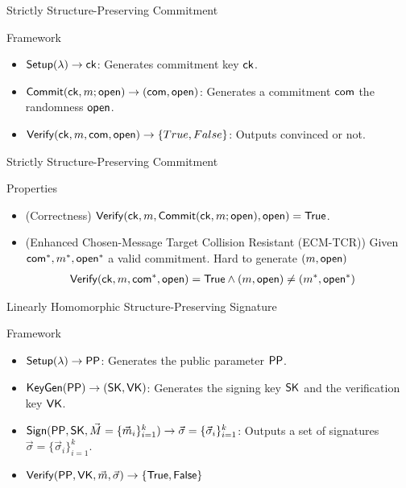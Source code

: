 \begin{frame}{Strictly Structure-Preserving Commitment~\cite{DBLP:conf/eurocrypt/AbeKOT15}}

  \begin{block}{Framework}
      \begin{itemize}
      \item ${\mathsf{Setup}}(\lambda) \to \mathsf{ck}$: Generates commitment key $\mathsf{ck}$.
      \item ${\mathsf{Commit}}(\mathsf{ck}, m; \mathsf{open}) \to (\mathsf{com},\mathsf{open})$: Generates a commitment $\mathsf{com}$ \wrt the randomness $\mathsf{open}$.
      \item ${\mathsf{Verify}}(\mathsf{ck}, m, \mathsf{com}, \mathsf{open}) \to \{True, False\}$: Outputs convinced or not.
      \end{itemize}
  \end{block}
\end{frame}
\begin{frame}{Strictly Structure-Preserving Commitment~\cite{DBLP:conf/eurocrypt/AbeKOT15}}
  \begin{block}{Properties}
    \begin{itemize}
    \item {\color{blue}(Correctness)} ${\mathsf{Verify}}(\mathsf{ck}, m, {\mathsf{Commit}}(\mathsf{ck}, m; \mathsf{open}), \mathsf{open}) = \mathsf{True}$.
    \item {\color{blue}(Enhanced Chosen-Message Target Collision Resistant (ECM-TCR))} Given $\mathsf{com}^*, m^*, \mathsf{open}^*$ a valid commitment. Hard to generate $(m, \mathsf{open})$ \st
      \begin{align*}
        {\mathsf{Verify}}(\mathsf{ck}, m, \mathsf{com}^*, \mathsf{open}) &= \mathsf{True} \wedge (m, \mathsf{open}) \neq (m^*, \mathsf{open}^*)
      \end{align*}
    \end{itemize}
  \end{block}


\end{frame}


\begin{frame}{Linearly Homomorphic Structure-Preserving Signature}
  \begin{block}{Framework}
  \begin{itemize}
  \item $\boldmath{{\mathsf{Setup}}(\lambda) \to \mathsf{PP}}$: Generates the public parameter $\mathsf{PP}$.
  \item $\boldmath{{\mathsf{KeyGen}}(\mathsf{PP}) \to (\mathsf{SK}, \mathsf{VK})}$: Generates the signing key $\mathsf{SK}$ and the verification key $\mathsf{VK}$.
  \item $\boldmath{{\mathsf{Sign}}(\mathsf{PP}, \mathsf{SK}, \vec{M} = \{\vec{m}_i\}_{i=1}^k) \to \vec{\sigma} = \{\vec{\sigma}_i\}_{i=1}^k}$: Outputs a set of signatures $\vec{\sigma} = \{\vec{\sigma}_i\}_{i=1}^k$.
  \item $\boldmath{{\mathsf{Verify}}(\mathsf{PP}, \mathsf{VK}, \vec{m}, \vec{\sigma}) \to \{\mathsf{True}, \mathsf{False}\}}$
  \end{itemize}
  \end{block}
\end{frame}

